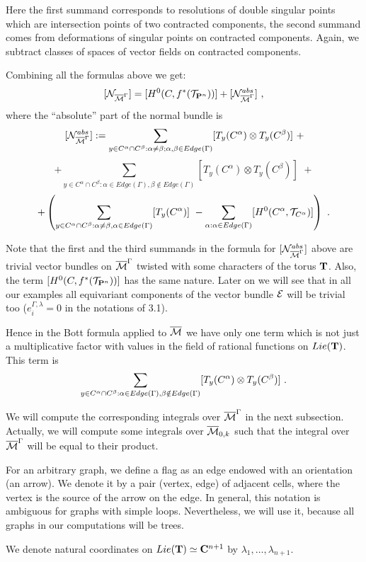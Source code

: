 \documentclass{amsart}
\begin{document}
Here the first summand corresponds to resolutions of double singular points
which are intersection points of two contracted components, the second summand
comes from deformations of singular points on contracted components. Again, we
subtract classes
 of spaces of vector fields on contracted components.

Combining all the formulas above we get:
$$[\mathcal N_{\overline{\mathcal{M}}^{\Gamma}}]=[H^0(C,f^*(\mathcal T_{\mathbf P^n}))]+
[\mathcal N^{abs}_{\overline{\mathcal{M}}^{\Gamma}}]\,\,,$$
where the ``absolute'' part of the normal bundle is
$$[\mathcal N^{abs}_{\overline{\mathcal{M}}^{\Gamma}}]:=\displaystyle\sum_{y\in
C^{\alpha}\cap C^{\beta}:\alpha\ne\beta;\alpha,\beta\in Edge(\Gamma)
} [T_y (C^{\alpha})\otimes T_y(C^{\beta})]\,\,+$$
$$+\sum_{y\in
C^{\alpha}\cap C^{\beta}:\alpha\in Edge(\Gamma),\beta\notin Edge(\Gamma)}
 [T_y (C^{\alpha})\otimes T_y(C^{\beta})]\,\,+$$
$$+\left(\sum_{y\in C^{\alpha}\cap C^{\beta}: \alpha\ne \beta,\alpha\in
Edge(\Gamma)} [T_y(C^{\alpha})]\,\,-
\sum_{\alpha:\alpha\in Edge(\Gamma)} [H^0(C^{\alpha}, \mathcal
T_{C^{\alpha}})]\right)\,\,.$$

Note that the first and the third summands in the formula for $[\mathcal
N^{abs}_{\overline{\mathcal{M}}^{\Gamma}}]$ above
 are trivial vector bundles on $\overline{\mathcal{M}}^{\Gamma}$ twisted with some characters of
the torus $\mathbf T$. Also, the term $[H^0(C,f^*(\mathcal T_{\mathbf P^n}))]$ has the same
nature. Later on we will see that in all our examples all equivariant
components of the vector bundle $\mathcal E$ will be trivial too ($e_i^{\Gamma,
\lambda}=0$ in the notations of 3.1).

Hence in the Bott formula applied to $\overline{\mathcal{M}}$ we have only one term which  is not
just a multiplicative factor with values in the field of rational functions on
$Lie(\mathbf T)$. This term is
$$\displaystyle\sum_{y\in
C^{\alpha}\cap C^{\beta}:\alpha\in Edge(\Gamma),\beta\notin Edge(\Gamma)}
 [T_y (C^{\alpha})\otimes T_y(C^{\beta})]\,\,.$$

 We will compute the
 corresponding integrals over $\overline{\mathcal{M}}^{\Gamma}$ in the next subsection.
  Actually, we will compute some integrals over $\overline{\mathcal{M}}_{0,k}$ such that the
integral over
$\overline{\mathcal{M}}^{\Gamma}$ will be equal to their product.

For an arbitrary graph, we  define a flag as an edge endowed with an
orientation (an arrow). We denote it by a pair (vertex, edge) of adjacent
cells, where the vertex is the source of the arrow on the  edge. In general,
this notation is ambiguous for graphs with simple loops. Nevertheless, we will
use it, because all graphs in our computations will be trees.

We denote natural coordinates on $Lie(\mathbf T)\simeq\mathbf C^{n+1}$ by
$\lambda_1,\dots,\lambda_{n+1}$.
\end{document}
